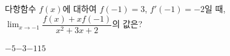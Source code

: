 다항함수 $f(x)$에 대하여 $f(-1)=3$, $f'(-1)=-2$일 때, $\displaystyle\lim_{x\to -1}\dfrac{f(x)+xf(-1)}{x^2+3x+2}$의 값은?
\begin{choices32}{$-5$}{$-3$}{$-1$}{$1$}{$5$}\end{choices32}
